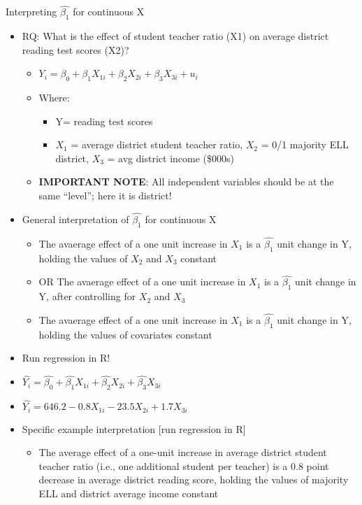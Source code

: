 \documentclass[8pt,ignorenonframetext,dvipsnames]{beamer}
\providecommand{\tightlist}{%
  \setlength{\itemsep}{0pt}\setlength{\parskip}{0pt}}
\renewcommand{\textbf}[1]{{\color{darkgray}\bfseries\fontfamily{Montserrat-TOsF}#1}}
\let\olditem\item
\renewcommand{\item}{%
  \olditem\vspace{4pt}
}
\begin{document}
\begin{frame}{Interpreting \(\hat{\beta_1}\) for continuous X}
\protect\hypertarget{interpreting-hatbeta_1-for-continuous-x}{}

\begin{itemize}
\tightlist
\item
  RQ: What is the effect of student teacher ratio (X1) on average
  district reading test scores (X2)?

  \begin{itemize}
  \tightlist
  \item
    \(Y_i = \beta_0 + \beta_1X_{1i} + \beta_2X_{2i} + \beta_3X_{3i} + u_i\)
  \item
    Where:

    \begin{itemize}
    \tightlist
    \item
      Y= reading test scores
    \item
      \(X_1\) = average district student teacher ratio, \(X_2\) = 0/1
      majority ELL district, \(X_3\) = avg district income (\$000s)
    \end{itemize}
  \item
    \textbf{IMPORTANT NOTE}: All independent variables should be at the
    same ``level''; here it is district!
  \end{itemize}
\item
  General interpretation of \(\hat{\beta_1}\) for continuous X

  \begin{itemize}
  \tightlist
  \item
    The avaerage effect of a one unit increase in \(X_1\) is a
    \(\hat{\beta_1}\) unit change in Y, holding the values of \(X_2\)
    and \(X_3\) constant
  \item
    OR The avaerage effect of a one unit increase in \(X_1\) is a
    \(\hat{\beta_1}\) unit change in Y, after controlling for \(X_2\)
    and \(X_3\)
  \item
    The avaerage effect of a one unit increase in \(X_1\) is a
    \(\hat{\beta_1}\) unit change in Y, holding the values of covariates
    constant
  \end{itemize}
\item
  Run regression in R!
\item
  \(\hat{Y_i} = \hat{\beta_0} + \hat{\beta_1} X_{1i} + \hat{\beta_2} X_{2i} + \hat{\beta_3} X_{3i}\)
\item
  \(\hat{Y_i} = 646.2 - 0.8 X_{1i} -23.5 X_{2i} + 1.7 X_{3i}\)
\item
  Specific example interpretation {[}run regression in R{]}

  \begin{itemize}
  \tightlist
  \item
    The average effect of a one-unit increase in average district
    student teacher ratio (i.e., one additional student per teacher) is
    a 0.8 point decrease in average district reading score, holding the
    values of majority ELL and district average income constant
  \end{itemize}
\end{itemize}

\end{frame}
\end{document}
